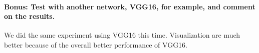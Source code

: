 \paragraph*{\textbf{Bonus:} Test with another network, VGG16, for example, and comment on the results.}
We did the same experiment using VGG16 this time. Visualization are much better because of the overall better performance of VGG16. %


